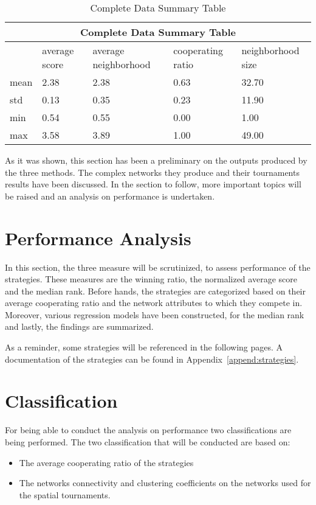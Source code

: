 \begin{table}[!hbtp]
	\centering
	\begin{adjustbox}{width=0.8\textwidth}
		\small
		\begin{tabular}{|l|l|l|l|l|}
			\hline
			\multicolumn{5}{|c|}{Complete Data Summary Table}                                      \\ \hline
			     & average score & average neighborhood & cooperating ratio & neighborhood size \\ \hline
			mean & 2.38          & 2.38                 & 0.63              & 32.70             \\ \hline
			std  & 0.13          & 0.35                 & 0.23              & 11.90             \\ \hline
			min  & 0.54          & 0.55                 & 0.00              & 1.00              \\ \hline
			max  & 3.58          & 3.89                 & 1.00              & 49.00             \\ \hline
		\end{tabular}
	\end{adjustbox}
	\caption{Complete Data Summary Table}
	\label{table:summary-complete-data}
\end{table}

As it was shown, this section has been a preliminary on the outputs produced by
the three methods. The complex networks they produce and their tournaments
results have been discussed. In the section to follow, more important topics will
be raised and an analysis on performance is undertaken.

\section{Performance Analysis}
\label{performance-analysis}
In this section, the three measure will be scrutinized, to assess performance of the
strategies. These measures are the winning ratio, the normalized average score
and the median rank. Before hands, the strategies are categorized based on their
average cooperating ratio and the network attributes to which they compete in. Moreover,
various regression models have been constructed, for the median rank and lastly,
the findings are summarized.

As a reminder, some strategies will be referenced in the following pages. A
documentation of the strategies can be found in Appendix~\ref{append:strategies}.

\section{Classification}
\label{sub:classification}
For being able to conduct the analysis on performance two classifications are
being performed. The two classification that will be conducted are based on:
\begin{itemize}
	\item The average cooperating ratio of the strategies
	\item The networks connectivity and clustering coefficients on the networks
	      used for the spatial tournaments.
\end{itemize}

